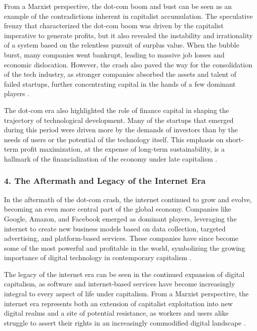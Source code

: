 \begin{refsection}
\begin{multicols}{2}
{From a Marxist perspective, the dot-com boom and bust can be seen as an example of the contradictions inherent in capitalist accumulation. The speculative frenzy that characterized the dot-com boom was driven by the capitalist imperative to generate profits, but it also revealed the instability and irrationality of a system based on the relentless pursuit of surplus value. When the bubble burst, many companies went bankrupt, leading to massive job losses and economic dislocation. However, the crash also paved the way for the consolidation of the tech industry, as stronger companies absorbed the assets and talent of failed startups, further concentrating capital in the hands of a few dominant players \cite{harvey2010enigma}.

The dot-com era also highlighted the role of finance capital in shaping the trajectory of technological development. Many of the startups that emerged during this period were driven more by the demands of investors than by the needs of users or the potential of the technology itself. This emphasis on short-term profit maximization, at the expense of long-term sustainability, is a hallmark of the financialization of the economy under late capitalism \cite{foster2007financialization}.

\subsubsection*{4. The Aftermath and Legacy of the Internet Era}

In the aftermath of the dot-com crash, the internet continued to grow and evolve, becoming an even more central part of the global economy. Companies like Google, Amazon, and Facebook emerged as dominant players, leveraging the internet to create new business models based on data collection, targeted advertising, and platform-based services. These companies have since become some of the most powerful and profitable in the world, symbolizing the growing importance of digital technology in contemporary capitalism \cite{fuchs2014digital}.

The legacy of the internet era can be seen in the continued expansion of digital capitalism, as software and internet-based services have become increasingly integral to every aspect of life under capitalism. From a Marxist perspective, the internet era represents both an extension of capitalist exploitation into new digital realms and a site of potential resistance, as workers and users alike struggle to assert their rights in an increasingly commodified digital landscape \cite{scholz2013digital}.

}
\end{multicols}
\end{refsection}
